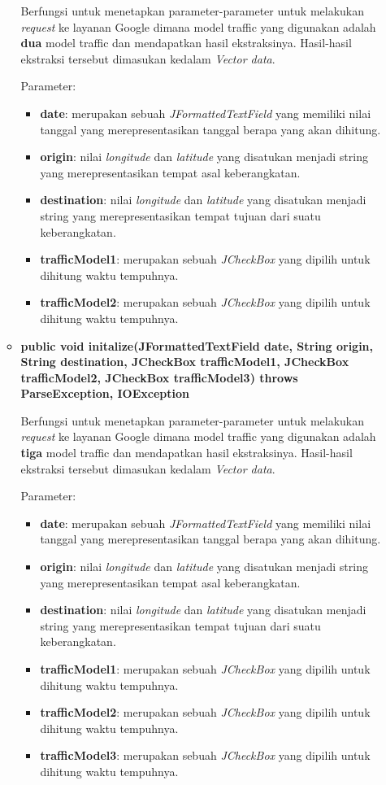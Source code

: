 \begin{enumerate}
\begin{itemize}
		Berfungsi untuk menetapkan parameter-parameter untuk melakukan \textit{request} ke layanan Google dimana model traffic yang digunakan adalah \textbf{dua} model traffic dan mendapatkan hasil ekstraksinya. Hasil-hasil ekstraksi tersebut dimasukan kedalam \textit{Vector data}.
		
		Parameter:
	\begin{itemize}
		\item \textbf{date}: merupakan sebuah \textit{JFormattedTextField} yang memiliki nilai tanggal yang merepresentasikan tanggal berapa yang akan dihitung. 
		\item \textbf{origin}: nilai \textit{longitude} dan \textit{latitude} yang disatukan menjadi string yang merepresentasikan tempat asal keberangkatan.
		\item \textbf{destination}: nilai \textit{longitude} dan \textit{latitude} yang disatukan menjadi string yang merepresentasikan tempat tujuan dari suatu keberangkatan.
		\item \textbf{trafficModel1}: merupakan sebuah \textit{JCheckBox} yang dipilih untuk dihitung waktu tempuhnya.
		\item \textbf{trafficModel2}: merupakan sebuah \textit{JCheckBox} yang dipilih untuk dihitung waktu tempuhnya.
	\end{itemize}
		
		\item \textbf{public void initalize(JFormattedTextField date, String origin, String destination, JCheckBox trafficModel1, JCheckBox trafficModel2, JCheckBox trafficModel3) throws ParseException, IOException}
		
		Berfungsi untuk menetapkan parameter-parameter untuk melakukan \textit{request} ke layanan Google dimana model traffic yang digunakan adalah \textbf{tiga} model traffic dan mendapatkan hasil ekstraksinya. Hasil-hasil ekstraksi tersebut dimasukan kedalam \textit{Vector data}.
		
		Parameter:
	\begin{itemize}
		\item \textbf{date}: merupakan sebuah \textit{JFormattedTextField} yang memiliki nilai tanggal yang merepresentasikan tanggal berapa yang akan dihitung. 
		\item \textbf{origin}: nilai \textit{longitude} dan \textit{latitude} yang disatukan menjadi string yang merepresentasikan tempat asal keberangkatan.
		\item \textbf{destination}: nilai \textit{longitude} dan \textit{latitude} yang disatukan menjadi string yang merepresentasikan tempat tujuan dari suatu keberangkatan.
		\item \textbf{trafficModel1}: merupakan sebuah \textit{JCheckBox} yang dipilih untuk dihitung waktu tempuhnya.
		\item \textbf{trafficModel2}: merupakan sebuah \textit{JCheckBox} yang dipilih untuk dihitung waktu tempuhnya.
		\item \textbf{trafficModel3}: merupakan sebuah \textit{JCheckBox} yang dipilih untuk dihitung waktu tempuhnya.
	\end{itemize}
		

\end{itemize}
\end{enumerate}
